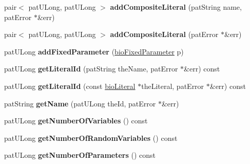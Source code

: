 \begin{DoxyCompactItemize}
\item 
\mbox{\label{classbio_literal_repository_ae95c66959688d15a97124702dd283548}} 
pair$<$ pat\+U\+Long, pat\+U\+Long $>$ {\bfseries add\+Composite\+Literal} (pat\+String name, pat\+Error $\ast$\&err)
\item 
\mbox{\label{classbio_literal_repository_ab7aa7c4ab5d0692e49c589f1f12a3e83}} 
pair$<$ pat\+U\+Long, pat\+U\+Long $>$ {\bfseries add\+Composite\+Literal} (pat\+Error $\ast$\&err)
\item 
\mbox{\label{classbio_literal_repository_ab866ee2771a136756481dad60daa2581}} 
pat\+U\+Long {\bfseries add\+Fixed\+Parameter} (\hyperlink{classbio_fixed_parameter}{bio\+Fixed\+Parameter} p)
\item 
\mbox{\label{classbio_literal_repository_a1ceb3fc91ed0740b68b093fc13636aeb}} 
pat\+U\+Long {\bfseries get\+Literal\+Id} (pat\+String the\+Name, pat\+Error $\ast$\&err) const
\item 
\mbox{\label{classbio_literal_repository_a6013819ad2c5fa5ce71f5dc6a5ecb519}} 
pat\+U\+Long {\bfseries get\+Literal\+Id} (const \hyperlink{classbio_literal}{bio\+Literal} $\ast$the\+Literal, pat\+Error $\ast$\&err) const
\item 
\mbox{\label{classbio_literal_repository_a693f0bd1f13bdf3eb27b02cd889ba72d}} 
pat\+String {\bfseries get\+Name} (pat\+U\+Long the\+Id, pat\+Error $\ast$\&err)
\item 
\mbox{\label{classbio_literal_repository_ac8d3978c02aa34b3974cf7072cbe3750}} 
pat\+U\+Long {\bfseries get\+Number\+Of\+Variables} () const
\item 
\mbox{\label{classbio_literal_repository_a03addef16d1bb48547938073a3a6b0df}} 
pat\+U\+Long {\bfseries get\+Number\+Of\+Random\+Variables} () const
\item 
\mbox{\label{classbio_literal_repository_a1da5ad9bef3d86eb24e29b017d611352}} 
pat\+U\+Long {\bfseries get\+Number\+Of\+Parameters} () const

\end{DoxyCompactItemize}
